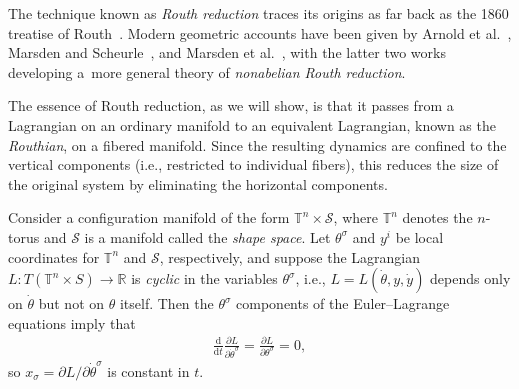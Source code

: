 \documentclass[pdftex]{sigma}
\numberwithin{equation}{section}
\begin{document}
The technique known as \emph{Routh reduction} traces its origins as far back as the 1860 treatise of Routh~\cite{Routh1860}. Modern geometric accounts have been given by Arnold et al.~\cite{ArKoNe1988}, Marsden and Scheurle~\cite{MaSc1993}, and Marsden et al.~\cite{MaRaSc2000}, with the latter two works developing a~more general theory of \emph{nonabelian Routh reduction}.

The essence of Routh reduction, as we will show, is that it passes from a Lagrangian on an ordinary manifold to an equivalent Lagrangian, known as the \emph{Routhian}, on a f\/ibered manifold. Since the resulting dynamics are conf\/ined to the vertical components (i.e., restricted to individual f\/ibers), this reduces the size of the original system by eliminating the horizontal components.

Consider a conf\/iguration manifold of the form $ \mathbb{T} ^n \times \mathcal{S} $, where $ \mathbb{T} ^n $ denotes the $n$-torus and $\mathcal{S}$ is a manifold called the \emph{shape space}. Let $ \theta ^\sigma $ and $ y ^i $ be local coordinates for $ \mathbb{T} ^n $ and $\mathcal{S}$, respectively, and suppose the Lagrangian $ L \colon T ( \mathbb{T} ^n \times S ) \rightarrow \mathbb{R} $ is \emph{cyclic} in the variables $ \theta ^\sigma $, i.e.,
$L = L ( \dot{\theta} , y , \dot{y} ) $ depends only on $ \dot{ \theta } $ but not on $ \theta $ itself. Then the $ \theta ^\sigma $ components of the Euler--Lagrange equations imply that
\begin{gather*}
 \frac{\mathrm{d}}{\mathrm{d}t} \frac{ \partial L }{ \partial \dot{\theta} ^\sigma } = \frac{ \partial L }{ \partial \theta
 ^\sigma } = 0,
\end{gather*}
so $ x _\sigma = \partial L / \partial \dot{\theta} ^\sigma $ is constant in $t$.
\end{document}
